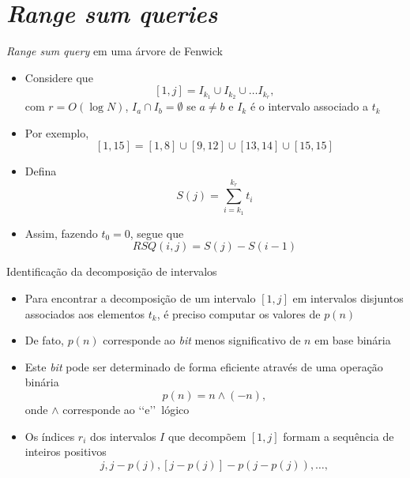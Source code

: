 \section{\it Range sum queries}

\begin{frame}[fragile]{\textit{Range sum query} em uma árvore de Fenwick}

    \begin{itemize}
        \item Considere que 
        \[
            [1, j] = I_{k_1} \cup I_{k_2} \cup \ldots I_{k_r},
        \]
        com $r = O(\log N)$, $I_a \cap I_b = \emptyset$ se $a\neq b$ e $I_k$ é o intervalo associado
        a $t_k$

        \item Por exemplo,
        \[
            [1, 15] = [1, 8]\cup [9, 12]\cup [13, 14]\cup [15, 15]
        \]

        \item Defina
        \[
            S(j) = \sum_{i = k_1}^{k_r} t_i
        \]

        \item Assim, fazendo $t_0 = 0$, segue que
        \[
            RSQ(i, j) = S(j) - S(i - 1)
        \]

    \end{itemize}

\end{frame}

\begin{frame}[fragile]{Identificação da decomposição de intervalos}

    \begin{itemize}
        \item Para encontrar a decomposição de um intervalo $[1, j]$ em intervalos disjuntos 
            associados aos elementos $t_k$, é preciso computar os valores de $p(n)$

        \item De fato, $p(n)$ corresponde ao \textit{bit} menos significativo de $n$ em base
            binária

        \item Este \textit{bit} pode ser determinado de forma eficiente através de uma operação
            binária
        \[
            p(n) = n \land (-n),
        \]
        onde $\land$ corresponde ao \lq\lq e\rq\rq\ lógico

        \item Os índices $r_i$ dos intervalos $I$ que decompõem $[1,j]$ formam a sequência
            de inteiros positivos 
        \[
            j, j - p(j), [j - p(j)] - p(j - p(j)), \ldots,
        \]
    \end{itemize}

\end{frame}

